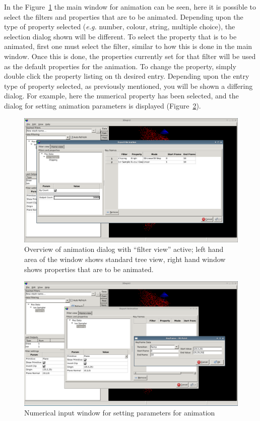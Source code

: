 \documentclass[10pt]{article}
\begin{document}
In the Figure~\ref{fig:animateFilterView} the main window for animation can be seen, here it is possible to select the filters and properties that are to be animated. Depending upon the type of property selected (\emph{e.g.} number, colour, string, multiple choice), the selection dialog shown will be different.  To select the property that is to be animated, first one must select the filter, similar to how this is done in the main window. Once this is done, the properties currently set for that filter will be used as the default properties for the animation. To change the property, simply double click the property listing on th desired entry. Depending upon the entry type of property selected, as previously mentioned, you will be shown a differing dialog. For example, here the numerical property has been selected, and the dialog for setting animation parameters is displayed (Figure~\ref{fig:animateParamDialog}). 

\begin{figure}
\begin{center}
 \includegraphics[width=0.9 \textwidth,keepaspectratio=true]{./figures/exportanimDialogFilterView.png}
 \caption{Overview of animation dialog with ``filter view'' active; left hand area of the window shows standard tree view, right hand window shows properties that are to be animated.}
\label{fig:animateFilterView}
\end{center}
\end{figure}



\begin{figure}
\begin{center}
 \includegraphics[width=0.9 \textwidth,keepaspectratio=true]{./figures/exportanimParamDialog.png}
 \caption{Numerical input window for setting parameters for animation}
\label{fig:animateParamDialog}
\end{center}
\end{figure}
\end{document}
